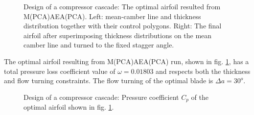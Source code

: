 \begin{figure}[h!]
\begin{minipage}[b]{1\linewidth}
 \centering
\end{minipage}
\caption{Design of a compressor cascade: The optimal airfoil resulted from M(PCA)AEA(PCA). Left: mean-camber line and thickness distribution together with their control polygons. Right: The final airfoil after superimposing thickness distributions on the mean camber line and turned to the fixed stagger angle.} 
\label{PCADrelaRes}
\end{figure}

The optimal airfoil resulting from M(PCA)AEA(PCA) run, shown in fig. \ref{PCADrelaRes}, has a total pressure loss coefficient value of $\omega=0.01803$ and respects both the thickness and flow turning constraints.  The flow turning of the optimal blade is $\Delta a=30^o$.

\begin{figure}[h!]
\begin{minipage}[b]{1\linewidth}
 \centering
\end{minipage}
\caption{Design of a compressor cascade: Pressure coefficient $C_p$ of the optimal airfoil shown in fig. \ref{PCADrelaRes}.} 
\label{PCADrelaRes_cp}
\end{figure}

